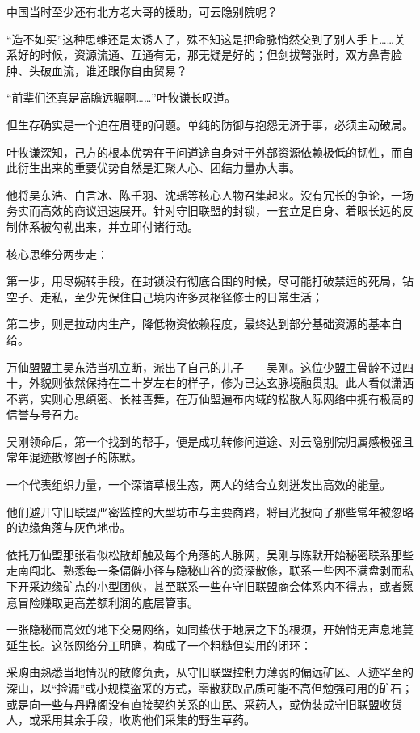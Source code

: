 中国当时至少还有北方老大哥的援助，可云隐别院呢？

“造不如买”这种思维还是太诱人了，殊不知这是把命脉悄然交到了别人手上……关系好的时候，资源流通、互通有无，那无疑是好的；但剑拔弩张时，双方鼻青脸肿、头破血流，谁还跟你自由贸易？

“前辈们还真是高瞻远瞩啊……”叶牧谦长叹道。

但生存确实是一个迫在眉睫的问题。单纯的防御与抱怨无济于事，必须主动破局。

叶牧谦深知，己方的根本优势在于问道途自身对于外部资源依赖极低的韧性，而自此衍生出来的重要优势自然是汇聚人心、团结力量办大事。

他将吴东浩、白言冰、陈千羽、沈瑶等核心人物召集起来。没有冗长的争论，一场务实而高效的商议迅速展开。针对守旧联盟的封锁，一套立足自身、着眼长远的反制体系被勾勒出来，并立即付诸行动。

核心思维分两步走：

第一步，用尽婉转手段，在封锁没有彻底合围的时候，尽可能打破禁运的死局，钻空子、走私，至少先保住自己境内许多灵枢径修士的日常生活；

第二步，则是拉动内生产，降低物资依赖程度，最终达到部分基础资源的基本自给。

万仙盟盟主吴东浩当机立断，派出了自己的儿子——吴刚。这位少盟主骨龄不过四十，外貌则依然保持在二十岁左右的样子，修为已达玄脉境融贯期。此人看似潇洒不羁，实则心思缜密、长袖善舞，在万仙盟遍布内域的松散人际网络中拥有极高的信誉与号召力。

吴刚领命后，第一个找到的帮手，便是成功转修问道途、对云隐别院归属感极强且常年混迹散修圈子的陈默。

一个代表组织力量，一个深谙草根生态，两人的结合立刻迸发出高效的能量。

他们避开守旧联盟严密监控的大型坊市与主要商路，将目光投向了那些常年被忽略的边缘角落与灰色地带。

依托万仙盟那张看似松散却触及每个角落的人脉网，吴刚与陈默开始秘密联系那些走南闯北、熟悉每一条偏僻小径与隐秘山谷的资深散修，联系一些因不满盘剥而私下开采边缘矿点的小型团伙，甚至联系一些在守旧联盟商会体系内不得志，或者愿意冒险赚取更高差额利润的底层管事。

一张隐秘而高效的地下交易网络，如同蛰伏于地层之下的根须，开始悄无声息地蔓延生长。这张网络分工明确，构成了一个粗糙但实用的闭环：

采购由熟悉当地情况的散修负责，从守旧联盟控制力薄弱的偏远矿区、人迹罕至的深山，以“捡漏”或小规模盗采的方式，零散获取品质可能不高但勉强可用的矿石；或是向一些与丹鼎阁没有直接契约关系的山民、采药人，或伪装成守旧联盟收货人，或采用其余手段，收购他们采集的野生草药。

